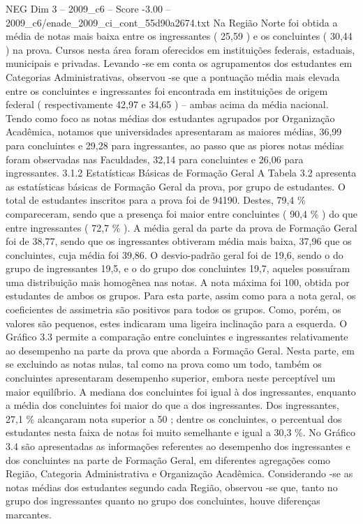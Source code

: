 \begin{textsample}{NEG Dim 3 – 2009\_c6 – Score -3.00 – 2009\_c6/enade\_2009\_ci\_cont\_55d90a2674.txt}
Na Região Norte foi obtida a média de notas mais baixa entre os ingressantes ( 25,59 ) e os concluintes ( 30,44 ) na prova.
Cursos nesta área foram oferecidos em instituições federais, estaduais, municipais e privadas.
Levando -se em conta os agrupamentos dos estudantes em Categorias Administrativas, observou -se que a pontuação média mais elevada entre os concluintes e ingressantes foi encontrada em instituições de origem federal ( respectivamente 42,97 e 34,65 ) – ambas acima da média nacional.
Tendo como foco as notas médias dos estudantes agrupados por Organização Acadêmica, notamos que universidades apresentaram as maiores médias, 36,99 para concluintes e 29,28 para ingressantes, ao passo que as piores notas médias foram observadas nas Faculdades, 32,14 para concluintes e 26,06 para ingressantes. 3.1.2 Estatísticas Básicas de Formação Geral A Tabela 3.2 apresenta as estatísticas básicas de Formação Geral da prova, por grupo de estudantes.
O total de estudantes inscritos para a prova foi de 94190.
Destes, 79,4 \% compareceram, sendo que a presença foi maior entre concluintes ( 90,4 \% ) do que entre ingressantes ( 72,7 \% ).
A média geral da parte da prova de Formação Geral foi de 38,77, sendo que os ingressantes obtiveram média mais baixa, 37,96 que os concluintes, cuja média foi 39,86.
O desvio-padrão geral foi de 19,6, sendo o do grupo de ingressantes 19,5, e o do grupo dos concluintes 19,7, aqueles possuíram uma distribuição mais homogênea nas notas.
A nota máxima foi 100, obtida por estudantes de ambos os grupos.
Para esta parte, assim como para a nota geral, os coeficientes de assimetria são positivos para todos os grupos.
Como, porém, os valores são pequenos, estes indicaram uma ligeira inclinação para a esquerda.
O Gráfico 3.3 permite a comparação entre concluintes e ingressantes relativamente ao desempenho na parte da prova que aborda a Formação Geral.
Nesta parte, em se excluindo as notas nulas, tal como na prova como um todo, também os concluintes apresentaram desempenho superior, embora neste perceptível um maior equilíbrio.
A mediana dos concluintes foi igual à dos ingressantes, enquanto a média dos concluintes foi maior do que a dos ingressantes.
Dos ingressantes, 27,1 \% alcançaram nota superior a 50 ; dentre os concluintes, o percentual dos estudantes nesta faixa de notas foi muito semelhante e igual a 30,3 \%.
No Gráfico 3.4 são apresentadas as informações referentes ao desempenho dos ingressantes e dos concluintes na parte de Formação Geral, em diferentes agregações como Região, Categoria Administrativa e Organização Acadêmica.
Considerando -se as notas médias dos estudantes segundo cada Região, observou -se que, tanto no grupo dos ingressantes quanto no grupo dos concluintes, houve diferenças marcantes.

\end{textsample}
